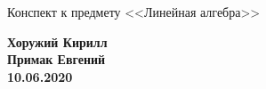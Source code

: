 
\begin{center}
    \LARGE Конспект к предмету <<Линейная алгебра>>
\end{center}
\begin{flushright}
    \textbf{Хоружий Кирилл} \\
    \textbf{Примак Евгений} \\
    \textbf{10.06.2020}
\end{flushright}

\tableofcontents
\newpage